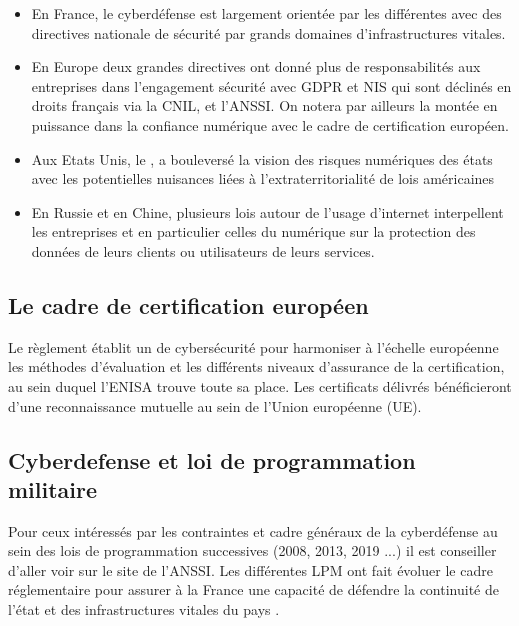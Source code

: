 \begin{itemize}
 \item En France, le cyberdéfense est largement orientée par les différentes  avec des directives nationale de sécurité par grands domaines d'infrastructures vitales.
 \item En Europe deux grandes directives ont donné plus de responsabilités aux entreprises dans l'engagement sécurité avec GDPR et NIS qui sont déclinés en droits français via la CNIL, et l'ANSSI. On notera par ailleurs la montée en puissance dans la confiance numérique avec le cadre de certification européen.
 \item Aux Etats Unis, le , a bouleversé la vision des risques numériques des états avec les potentielles nuisances liées à l'extraterritorialité de lois américaines
 \item En Russie et en Chine, plusieurs lois autour de l'usage d'internet interpellent les entreprises et en particulier celles du numérique sur la protection des données de leurs clients ou utilisateurs de leurs services.
\end{itemize}


\subsection{Le cadre de certification européen}

Le règlement établit un 
 de cybersécurité pour harmoniser à l’échelle européenne les méthodes d’évaluation et les différents niveaux d’assurance de la certification, au sein duquel l’ENISA trouve toute sa place. Les certificats délivrés bénéficieront d’une reconnaissance mutuelle au sein de l’Union européenne (UE). 

\subsection{Cyberdefense et loi de programmation militaire}
Pour ceux intéressés par les contraintes et cadre généraux de la cyberdéfense au sein des lois de programmation successives (2008, 2013, 2019 ...) il est conseiller d'aller voir sur le site de l'ANSSI. Les différentes LPM ont fait évoluer le cadre réglementaire pour assurer à la France une capacité de défendre la continuité de l'état et des infrastructures vitales du pays .
